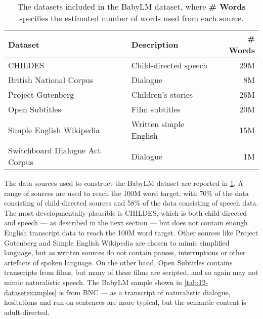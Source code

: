 \begin{table}[t]
    \centering
    \footnotesize
    \begin{tabular}{llr}
        \toprule
        \textbf{Dataset} & \textbf{Description} & \textbf{\# Words} \\
        \midrule
        CHILDES \citep{macwhinney1985child} & Child-directed speech & 29M \\
        British National Corpus \citep[BNC,][]{bnc2007} & Dialogue & 8M \\
        Project Gutenberg \citep{gerlach2018standardizedprojectgutenbergcorpus} & Children's stories & 26M \\
        Open Subtitles \citep{lison-tiedemann-2016-opensubtitles2016} & Film subtitles & 20M \\
        Simple English Wikipedia\footnotemark & Written simple English & 15M \\
        Switchboard Dialogue Act Corpus \citep{stolcke-etal-2000-dialogue} & Dialogue & 1M \\
        \bottomrule      
    \end{tabular}
    \caption{The datasets included in the BabyLM dataset, where \textbf{\# Words} specifies the estimated number of words used from each source.}
    \label{tab:12-babylm}
\end{table}

The data sources used to construct the BabyLM dataset are reported in \cref{tab:12-babylm}. A range of sources are used to reach the 100M word target, with 70\% of the data consisting of child-directed sources and 58\% of the data consisting of speech data. The most developmentally-plausible is CHILDES, which is both child-directed and speech --- as described in the next section --- but does not contain enough English transcript data to reach the 100M word target. Other sources like Project Gutenberg and Simple English Wikipedia are chosen to mimic simplified language, but as written sources do not contain pauses, interruptions or other artefacts of spoken language. On the other hand, Open Subtitles contains transcripts from films, but many of these films are scripted, and so again may not mimic naturalistic speech. The BabyLM sample shown in \cref{tab:12-datasetexamples} is from BNC --- as a transcript of naturalistic dialogue, hesitations and run-on sentences are more typical, but the semantic content is adult-directed.

